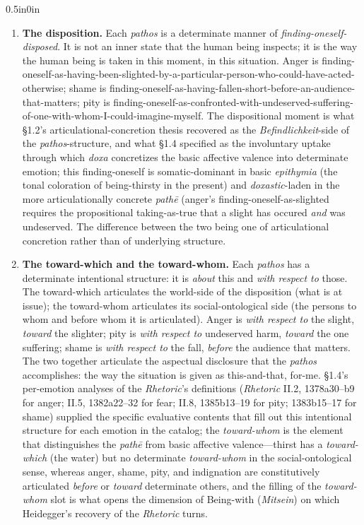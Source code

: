 \documentclass{article}
\begin{document}
\begin{adjustwidth}{0.5in}{0in}
    \begin{enumerate}
        \item \textbf{The disposition.} Each \textit{pathos} is a determinate manner of \textit{finding-oneself-disposed}. It is not an inner state that the human being inspects; it is the way the human being is taken in this moment, in this situation. Anger is finding-oneself-as-having-been-slighted-by-a-particular-person-who-could-have-acted-otherwise; shame is finding-oneself-as-having-fallen-short-before-an-audience-that-matters; pity is finding-oneself-as-confronted-with-undeserved-suffering-of-one-with-whom-I-could-imagine-myself. The dispositional moment is what \S1.2's articulational-concretion thesis recovered as the \textit{Befindlichkeit}-side of the \textit{pathos}-structure, and what \S1.4 specified as the involuntary uptake through which \textit{doxa} concretizes the basic affective valence into determinate emotion; this finding-oneself is somatic-dominant in basic \textit{epithymia} (the tonal coloration of being-thirsty in the present) and \textit{doxastic}-laden in the more articulationally concrete \textit{pathē} (anger's finding-oneself-as-slighted requires the propositional taking-as-true that a slight has occured \textit{and} was undeserved. The difference between the two being one of articulational concretion rather than of underlying structure.
        
        \item \textbf{The toward-which and the toward-whom.} Each \textit{pathos} has a determinate intentional structure: it is \textit{about} this and \textit{with respect to} those. The toward-which articulates the world-side of the disposition (what is at issue); the toward-whom articulates its social-ontological side (the persons to whom and before whom it is articulated). Anger is \textit{with respect to} the slight, \textit{toward} the slighter; pity is \textit{with respect to} undeserved harm, \textit{toward} the one suffering; shame is \textit{with respect to} the fall, \textit{before} the audience that matters. The two together articulate the aspectual disclosure that the \textit{pathos} accomplishes: the way the situation is given as this-and-that, for-me. \S1.4's per-emotion analyses of the \textit{Rhetoric}'s definitions (\textit{Rhetoric} II.2, 1378a30--b9 for anger; II.5, 1382a22--32 for fear; II.8, 1385b13--19 for pity; 1383b15--17 for shame) supplied the specific evaluative contents that fill out this intentional structure for each emotion in the catalog; the \textit{toward-whom} is the element that distinguishes the \textit{pathē} from basic affective valence---thirst has a \textit{toward-which} (the water) but no determinate \textit{toward-whom} in the social-ontological sense, whereas anger, shame, pity, and indignation are constitutively articulated \textit{before} or \textit{toward} determinate others, and the filling of the \textit{toward-whom} slot is what opens the dimension of Being-with (\textit{Mitsein}) on which Heidegger's recovery of the \textit{Rhetoric} turns.
              

\end{enumerate}
\end{adjustwidth}
\end{document}
